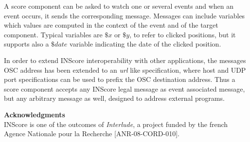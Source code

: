 \documentclass{nime-workshop}
\begin{document}
A score component can be asked to watch one or several events and when an event occurs, it sends the corresponding message. Messages can include variables which values are computed in the context of the event and of the target component. Typical variables are $\$x$ or $\$y$, to refer to clicked positions, but it supports also a $\$date$ variable indicating the date of the clicked position.

In order to extend INScore interoperability with other applications, the messages OSC address has been extended to an \emph{url} like specification, where host and UDP port specifications can be used to prefix the OSC destination address. Thus a score component accepts any INScore legal message as event associated message, but any arbitrary message as well, designed to address external programs.


\vspace{4mm}
\textbf{Acknowledgments} \\
INScore is one of the outcomes of \emph{Interlude}, a project funded by the french Agence Nationale pour la Recherche [ANR-08-CORD-010].




\end{document}
